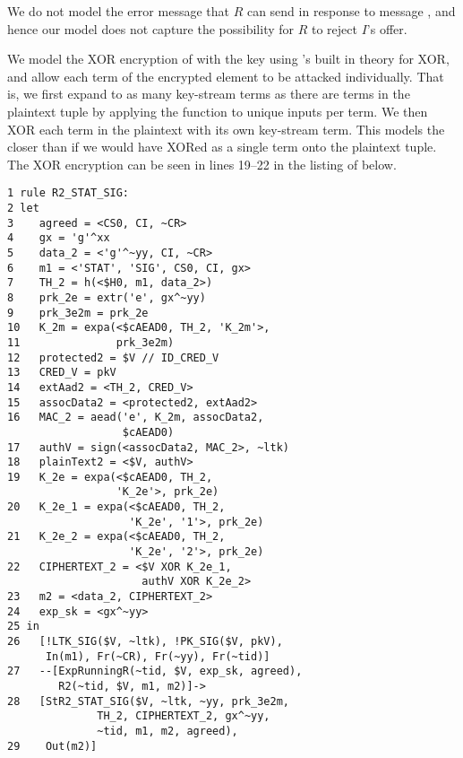 %
We do not model the error message that $R$ can send in response to message
\mMsgone, and hence our model does not
capture the possibility for $R$ to reject $I$'s offer.
%

%
We model the XOR encryption of  with the key  using
\mTamarin{}'s built in theory for XOR, and allow each term of the encrypted
element to be attacked individually.
%
That is, we first expand  to as many key-stream terms as there are
terms in the plaintext tuple by applying the \mHkdfExpand{} function to unique
inputs per term.
%
We then XOR each term in the plaintext with its own key-stream term.
%
This models the \mSpec{} closer than if we would have XORed  as a
single term onto the plaintext tuple.
%
The XOR encryption can be seen in lines 19--22 in the listing of
 below.
%
%
\begin{small}
\begin{verbatim}
1 rule R2_STAT_SIG:
2 let
3    agreed = <CS0, CI, ~CR>
4    gx = 'g'^xx
5    data_2 = <'g'^~yy, CI, ~CR>
6    m1 = <'STAT', 'SIG', CS0, CI, gx>
7    TH_2 = h(<$H0, m1, data_2>)
8    prk_2e = extr('e', gx^~yy)
9    prk_3e2m = prk_2e
10   K_2m = expa(<$cAEAD0, TH_2, 'K_2m'>,
11               prk_3e2m)
12   protected2 = $V // ID_CRED_V
13   CRED_V = pkV
14   extAad2 = <TH_2, CRED_V>
15   assocData2 = <protected2, extAad2>
16   MAC_2 = aead('e', K_2m, assocData2,
                  $cAEAD0)
17   authV = sign(<assocData2, MAC_2>, ~ltk)
18   plainText2 = <$V, authV>
19   K_2e = expa(<$cAEAD0, TH_2,
                 'K_2e'>, prk_2e)
20   K_2e_1 = expa(<$cAEAD0, TH_2,
                   'K_2e', '1'>, prk_2e)
21   K_2e_2 = expa(<$cAEAD0, TH_2,
                   'K_2e', '2'>, prk_2e)
22   CIPHERTEXT_2 = <$V XOR K_2e_1,
                     authV XOR K_2e_2>
23   m2 = <data_2, CIPHERTEXT_2>
24   exp_sk = <gx^~yy>
25 in
26   [!LTK_SIG($V, ~ltk), !PK_SIG($V, pkV),
      In(m1), Fr(~CR), Fr(~yy), Fr(~tid)]
27   --[ExpRunningR(~tid, $V, exp_sk, agreed),
        R2(~tid, $V, m1, m2)]->
28   [StR2_STAT_SIG($V, ~ltk, ~yy, prk_3e2m,
              TH_2, CIPHERTEXT_2, gx^~yy,
              ~tid, m1, m2, agreed),
29    Out(m2)]
\end{verbatim}
\end{small}
%

